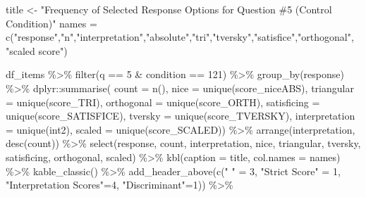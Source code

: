 \documentclass[
  letterpaper,
  DIV=11,
  numbers=noendperiod]{scrreprt}
\newenvironment{Shaded}{\begin{snugshade}}{\end{snugshade}}
\newcommand{\AttributeTok}[1]{\textcolor[rgb]{0.40,0.45,0.13}{#1}}
\newcommand{\DecValTok}[1]{\textcolor[rgb]{0.68,0.00,0.00}{#1}}
\newcommand{\FunctionTok}[1]{\textcolor[rgb]{0.28,0.35,0.67}{#1}}
\newcommand{\NormalTok}[1]{\textcolor[rgb]{0.00,0.23,0.31}{#1}}
\newcommand{\OtherTok}[1]{\textcolor[rgb]{0.00,0.23,0.31}{#1}}
\newcommand{\SpecialCharTok}[1]{\textcolor[rgb]{0.37,0.37,0.37}{#1}}
\newcommand{\StringTok}[1]{\textcolor[rgb]{0.13,0.47,0.30}{#1}}
\begin{document}
\begin{Shaded}
\begin{Highlighting}[]
\NormalTok{title }\OtherTok{\textless{}{-}} \StringTok{"Frequency of Selected Response Options for Question \#5 (Control Condition)"}
\NormalTok{names }\OtherTok{=} \FunctionTok{c}\NormalTok{(}\StringTok{"response"}\NormalTok{,}\StringTok{"n"}\NormalTok{,}\StringTok{"interpretation"}\NormalTok{,}\StringTok{"absolute"}\NormalTok{,}\StringTok{"tri"}\NormalTok{,}\StringTok{"tversky"}\NormalTok{,}\StringTok{"satisfice"}\NormalTok{,}\StringTok{"orthogonal"}\NormalTok{, }\StringTok{"scaled score"}\NormalTok{)}

\NormalTok{df\_items }\SpecialCharTok{\%\textgreater{}\%} \FunctionTok{filter}\NormalTok{(q }\SpecialCharTok{==} \DecValTok{5} \SpecialCharTok{\&}\NormalTok{ condition }\SpecialCharTok{==} \DecValTok{121}\NormalTok{) }\SpecialCharTok{\%\textgreater{}\%} \FunctionTok{group\_by}\NormalTok{(response) }\SpecialCharTok{\%\textgreater{}\%} 
\NormalTok{  dplyr}\SpecialCharTok{::}\FunctionTok{summarise}\NormalTok{( }\AttributeTok{count =} \FunctionTok{n}\NormalTok{(), }
                    \AttributeTok{nice =} \FunctionTok{unique}\NormalTok{(score\_niceABS),}
                    \AttributeTok{triangular =} \FunctionTok{unique}\NormalTok{(score\_TRI), }
                    \AttributeTok{orthogonal =}  \FunctionTok{unique}\NormalTok{(score\_ORTH),}
                    \AttributeTok{satisficing =}  \FunctionTok{unique}\NormalTok{(score\_SATISFICE),}
                    \AttributeTok{tversky =} \FunctionTok{unique}\NormalTok{(score\_TVERSKY),}
                    \AttributeTok{interpretation =} \FunctionTok{unique}\NormalTok{(int2),}
                    \AttributeTok{scaled =} \FunctionTok{unique}\NormalTok{(score\_SCALED)) }\SpecialCharTok{\%\textgreater{}\%} 
  \FunctionTok{arrange}\NormalTok{(interpretation, }\FunctionTok{desc}\NormalTok{(count)) }\SpecialCharTok{\%\textgreater{}\%} 
  \FunctionTok{select}\NormalTok{(response, count, interpretation, nice, }
\NormalTok{         triangular, tversky, satisficing, orthogonal, scaled) }\SpecialCharTok{\%\textgreater{}\%} 
  \FunctionTok{kbl}\NormalTok{(}\AttributeTok{caption =}\NormalTok{ title, }\AttributeTok{col.names =}\NormalTok{ names) }\SpecialCharTok{\%\textgreater{}\%}  \FunctionTok{kable\_classic}\NormalTok{() }\SpecialCharTok{\%\textgreater{}\%} 
  \FunctionTok{add\_header\_above}\NormalTok{(}\FunctionTok{c}\NormalTok{(}\StringTok{" "} \OtherTok{=} \DecValTok{3}\NormalTok{, }\StringTok{"Strict Score"} \OtherTok{=} \DecValTok{1}\NormalTok{, }\StringTok{"Interpretation Scores"}\OtherTok{=}\DecValTok{4}\NormalTok{, }\StringTok{"Discriminant"}\OtherTok{=}\DecValTok{1}\NormalTok{)) }\SpecialCharTok{\%\textgreater{}\%}

\end{Highlighting}
\end{Shaded}
\end{document}
